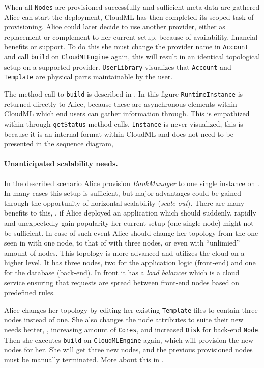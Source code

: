 When all \texttt{Nodes} are provisioned successfully and sufficient meta-data are gathered
Alice can start the deployment, CloudML has then completed its scoped task of provisioning.
Alice could later decide to use another provider, either as replacement or complement to her current setup,
because of availability, financial benefits or support.
To do this she must change the provider name in \texttt{Account} and call \texttt{build} on \texttt{CloudMLEngine} again,
this will result in an identical topological setup on a supported provider.
\texttt{UserLibrary} visualizes that \texttt{Account} and \texttt{Template} are 
physical parts maintainable by the user.

The method call to \texttt{build} is described in .
In this figure \texttt{RuntimeInstance} is returned directly to Alice,
because these are asynchronous elements within CloudML which end users can gather 
information through.
This is empathized within  through \texttt{getStatus} method calls.
\texttt{Instance} is never visualized, this is because it is an internal format
within CloudML and does not need to be presented in the sequence diagram,

\paragraph{Unanticipated scalability needs.}

In the described scenario Alice provision \emph{BankManager} to one single instance on .
In many cases this setup is sufficient, but major advantages
could be gained through the opportunity of horizontal scalability (\emph{scale out}).
There are many benefits to this, 
\eg, if Alice deployed an application which should suddenly, 
rapidly and unexpectedly gain popularity her current setup (one single node) might not be sufficient.
In case of such event Alice should change her topology from the one seen in 
 with one node, to that of  with three nodes,
or even  with ``unlimied'' amount of nodes.
This topology is more advanced and utilizes the cloud on a higher level.
It has three nodes, two for the application logic (front-end) and one for the database (back-end).
In front it has a \emph{load balancer} which is a cloud service ensuring that requests
are spread between front-end nodes based on predefined rules.

Alice changes her topology by editing her existing \texttt{Template} files 
to contain three nodes instead of one. 
She also changes the node attributes to suite their new needs better,
\ie, increasing amount of \texttt{Cores}, and increased \texttt{Disk} for back-end \texttt{Node}.
Then she executes \texttt{build} on \texttt{CloudMLEngine} again,
which will provision the new nodes for her.
She will get three new nodes, and the previous provisioned nodes must be manually terminated.
More about this in .


